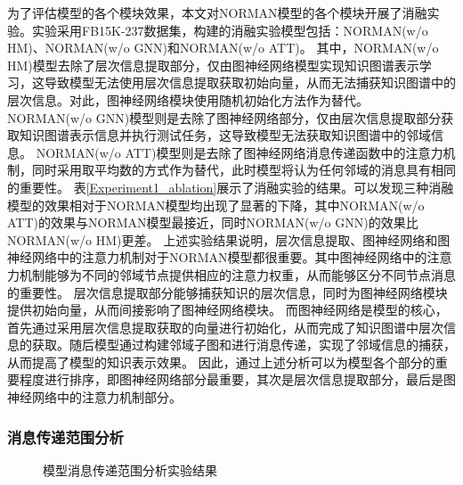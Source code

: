 \documentclass[algorithmlist, AutoFakeBold, AutoFakeSlant, figurelist, tablelist, nomlist, engineering, openany]{seuthesix} %
\begin{document}
为了评估模型的各个模块效果，本文对NORMAN模型的各个模块开展了消融实验。实验采用FB15K-237数据集，构建的消融实验模型包括：NORMAN(w/o HM)、NORMAN(w/o GNN)和NORMAN(w/o ATT)。
其中，NORMAN(w/o HM)模型去除了层次信息提取部分，仅由图神经网络模型实现知识图谱表示学习，这导致模型无法使用层次信息提取获取初始向量，从而无法捕获知识图谱中的层次信息。对此，图神经网络模块使用随机初始化方法作为替代。
NORMAN(w/o GNN)模型则是去除了图神经网络部分，仅由层次信息提取部分获取知识图谱表示信息并执行测试任务，这导致模型无法获取知识图谱中的邻域信息。
NORMAN(w/o ATT)模型则是去除了图神经网络消息传递函数中的注意力机制，同时采用取平均数的方式作为替代，此时模型将认为任何邻域的消息具有相同的重要性。
表\ref{Experiment1_ablation}展示了消融实验的结果。可以发现三种消融模型的效果相对于NORMAN模型均出现了显著的下降，其中NORMAN(w/o ATT)的效果与NORMAN模型最接近，同时NORMAN(w/o GNN)的效果比NORMAN(w/o HM)更差。
上述实验结果说明，层次信息提取、图神经网络和图神经网络中的注意力机制对于NORMAN模型都很重要。其中图神经网络中的注意力机制能够为不同的邻域节点提供相应的注意力权重，从而能够区分不同节点消息的重要性。
层次信息提取部分能够捕获知识的层次信息，同时为图神经网络模块提供初始向量，从而间接影响了图神经网络模块。
而图神经网络是模型的核心，首先通过采用层次信息提取获取的向量进行初始化，从而完成了知识图谱中层次信息的获取。随后模型通过构建邻域子图和进行消息传递，实现了邻域信息的捕获，从而提高了模型的知识表示效果。
因此，通过上述分析可以为模型各个部分的重要程度进行排序，即图神经网络部分最重要，其次是层次信息提取部分，最后是图神经网络中的注意力机制部分。

\subsubsection{消息传递范围分析}
\begin{figure}[t]
  \centering
  \caption{模型消息传递范围分析实验结果}
  \label{Experiment1_messageRange}
\end{figure}
\end{document}
